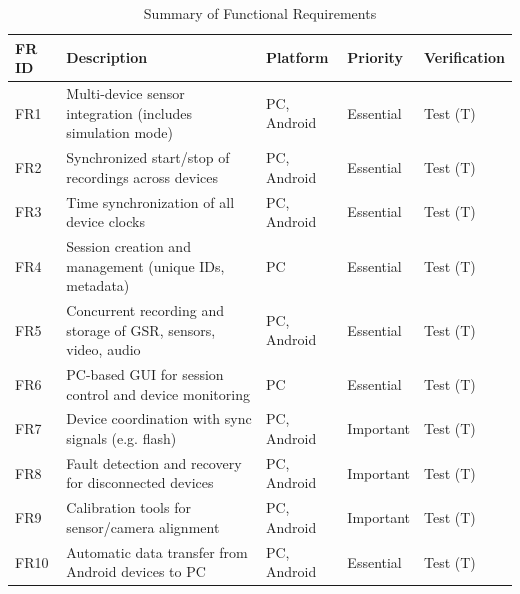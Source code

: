 \begin{table}[h!]
    \centering
    \caption{Summary of Functional Requirements}
    \label{tab:fr_summary}
    \begin{tabular}{@{}lllll@{}}
        \toprule
        \textbf{FR ID} & \textbf{Description}                                           & \textbf{Platform} & \textbf{Priority} & \textbf{Verification} \\ \midrule
        FR1            & Multi-device sensor integration (includes simulation mode)     & PC, Android       & Essential         & Test (T)              \\
        FR2            & Synchronized start/stop of recordings across devices           & PC, Android       & Essential         & Test (T)              \\
        FR3            & Time synchronization of all device clocks                      & PC, Android       & Essential         & Test (T)              \\
        FR4            & Session creation and management (unique IDs, metadata)         & PC                & Essential         & Test (T)              \\
        FR5            & Concurrent recording and storage of GSR, sensors, video, audio & PC, Android       & Essential         & Test (T)              \\
        FR6            & PC-based GUI for session control and device monitoring         & PC                & Essential         & Test (T)              \\
        FR7            & Device coordination with sync signals (e.g. flash)             & PC, Android       & Important         & Test (T)              \\
        FR8            & Fault detection and recovery for disconnected devices          & PC, Android       & Important         & Test (T)              \\
        FR9            & Calibration tools for sensor/camera alignment                  & PC, Android       & Important         & Test (T)              \\
        FR10           & Automatic data transfer from Android devices to PC             & PC, Android       & Essential         & Test (T)              \\ \bottomrule
    \end{tabular}
\end{table}
